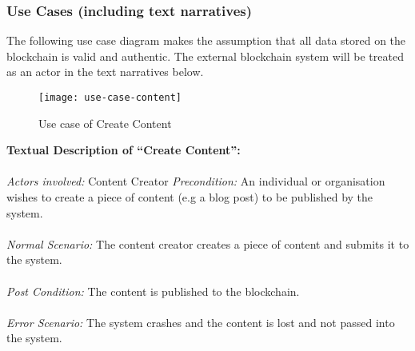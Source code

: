 \subsubsection{Use Cases (including text narratives)}
The following use case diagram makes the assumption that all data stored 
on the blockchain is valid and authentic. The external blockchain system will 
be treated as an actor in the text narratives below.

\begin{figure}[h]
\centering %
\texttt{[image: use-case-content]} %
\caption{Use case of Create Content}
\label{fig: create-content} %
\end{figure}

\noindent
\textbf{Textual Description of “Create Content”:} \\ \\
\textit{Actors involved:} Content Creator
\textit{Precondition:} An individual or organisation wishes to create a piece of content 
					   (e.g a blog post) to be published by the system. \\ \\
\textit{Normal Scenario:} The content creator creates a piece of content and submits it to the system. \\ \\
\textit{Post Condition:} The content is published to the blockchain. \\ \\
\textit{Error Scenario:} The system crashes and the content is lost and not passed into the system. \\ \\

